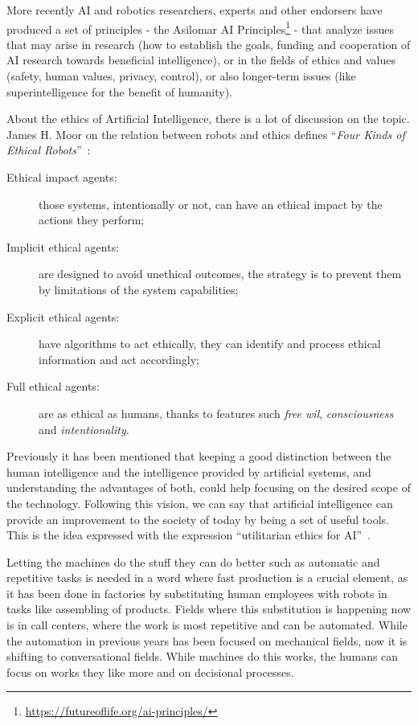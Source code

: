More recently AI and robotics researchers, experts and other endorsers have produced a set of principles - the Asilomar AI Principles\footnote{\url{https://futureoflife.org/ai-principles/}} - that analyze issues that may arise in research (how to establish the goals, funding and cooperation of AI research towards beneficial intelligence), or in the fields of ethics and values (safety, human values, privacy, control), or also longer-term issues (like superintelligence for the benefit of humanity).

About the ethics of Artificial Intelligence, there is a lot of discussion on the topic. James H. Moor on the relation between robots and ethics defines ``\textit{Four Kinds of Ethical Robots}''~\cite{moor2009four}:

\begin{description}
	\item[Ethical impact agents:] those systems, intentionally or not, can have an ethical impact by the actions they perform;
	\item[Implicit ethical agents:] are designed to avoid unethical outcomes, the strategy is to prevent them by limitations of the system capabilities;
	\item[Explicit ethical agents:] have algorithms to act ethically, they can identify and process ethical information and act accordingly;
	\item[Full ethical agents:] are as ethical as humans, thanks to features such \textit{free wil}, \textit{consciousness} and \textit{intentionality}.
\end{description}
Previously it has been mentioned that keeping a good distinction between the human intelligence and the intelligence provided by artificial systems, and understanding the advantages of both, could help focusing on the desired scope of the technology. Following this vision, we can say that artificial intelligence can provide an improvement to the society of today by being a set of useful tools. This is the idea expressed with the expression ``utilitarian ethics for AI''~\cite{hibbard2014ethical}.

Letting the machines do the stuff they can do better such as automatic and repetitive tasks is needed in a word where fast production is a crucial element, as it has been done in factories by substituting human employees with robots in tasks like assembling of products. Fields where this substitution is happening now is in call centers, where the work is most repetitive and can be automated. While the automation in previous years has been focused on mechanical fields, now it is shifting to conversational fields. While machines do this works, the humans can focus on works they like more and on decisional processes.

